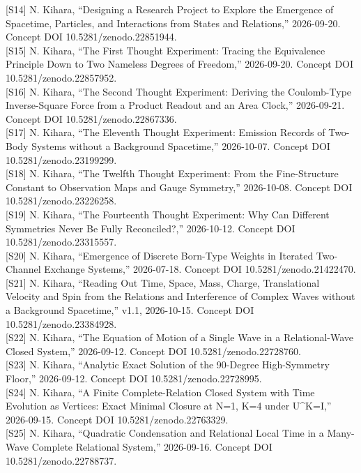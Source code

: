 \documentclass[
  a4paper,
]{article}
\begin{document}
{[}S14{]} N. Kihara, ``Designing a Research Project to Explore the
Emergence of Spacetime, Particles, and Interactions from States and
Relations,'' 2026-09-20. Concept DOI 10.5281/zenodo.22851944.\\
{[}S15{]} N. Kihara, ``The First Thought Experiment: Tracing the
Equivalence Principle Down to Two Nameless Degrees of Freedom,''
2026-09-20. Concept DOI 10.5281/zenodo.22857952.\\
{[}S16{]} N. Kihara, ``The Second Thought Experiment: Deriving the
Coulomb-Type Inverse-Square Force from a Product Readout and an Area
Clock,'' 2026-09-21. Concept DOI 10.5281/zenodo.22867336.\\
{[}S17{]} N. Kihara, ``The Eleventh Thought Experiment: Emission Records
of Two-Body Systems without a Background Spacetime,'' 2026-10-07.
Concept DOI 10.5281/zenodo.23199299.\\
{[}S18{]} N. Kihara, ``The Twelfth Thought Experiment: From the
Fine-Structure Constant to Observation Maps and Gauge Symmetry,''
2026-10-08. Concept DOI 10.5281/zenodo.23226258.\\
{[}S19{]} N. Kihara, ``The Fourteenth Thought Experiment: Why Can
Different Symmetries Never Be Fully Reconciled?,'' 2026-10-12. Concept
DOI 10.5281/zenodo.23315557.\\
{[}S20{]} N. Kihara, ``Emergence of Discrete Born-Type Weights in
Iterated Two-Channel Exchange Systems,'' 2026-07-18. Concept DOI
10.5281/zenodo.21422470.\\
{[}S21{]} N. Kihara, ``Reading Out Time, Space, Mass, Charge,
Translational Velocity and Spin from the Relations and Interference of
Complex Waves without a Background Spacetime,'' v1.1, 2026-10-15.
Concept DOI 10.5281/zenodo.23384928.\\
{[}S22{]} N. Kihara, ``The Equation of Motion of a Single Wave in a
Relational-Wave Closed System,'' 2026-09-12. Concept DOI
10.5281/zenodo.22728760.\\
{[}S23{]} N. Kihara, ``Analytic Exact Solution of the 90-Degree
High-Symmetry Floor,'' 2026-09-12. Concept DOI
10.5281/zenodo.22728995.\\
{[}S24{]} N. Kihara, ``A Finite Complete-Relation Closed System with
Time Evolution as Vertices: Exact Minimal Closure at N=1, K=4 under
U\^{}K=I,'' 2026-09-15. Concept DOI 10.5281/zenodo.22763329.\\
{[}S25{]} N. Kihara, ``Quadratic Condensation and Relational Local Time
in a Many-Wave Complete Relational System,'' 2026-09-16. Concept DOI
10.5281/zenodo.22788737.\\
\end{document}

